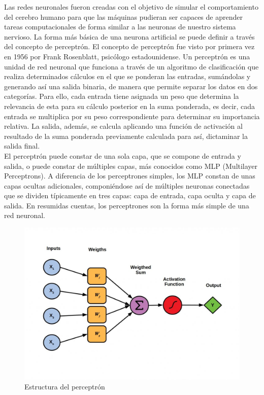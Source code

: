 Las redes neuronales fueron creadas con el objetivo de simular el comportamiento del cerebro humano para que las máquinas pudieran ser capaces de aprender tareas computacionales de forma similar a las neuronas de nuestro sistema nervioso. La forma más básica de una neurona artificial se puede definir a través del concepto de perceptrón. El concepto de perceptrón fue visto por primera vez en 1956 por Frank Rosenblatt, psicólogo estadounidense. Un perceptrón es una unidad de red neuronal que funciona a través de un algoritmo de clasificación que realiza determinados cálculos en el que se ponderan las entradas, sumándolas y generando así una salida binaria, de manera que permite separar los datos en dos categorías. Para ello, cada entrada tiene asignada un peso que determina la relevancia de esta para su cálculo posterior en la suma ponderada, es decir, cada entrada se multiplica por su peso correspondiente para determinar su importancia relativa. La salida, además, se calcula aplicando una función de activación al resultado de la suma ponderada previamente calculada para así, dictaminar la salida final.\\

El perceptrón puede constar de una sola capa, que se compone de entrada y salida, o puede constar de múltiples capas, más conocidos como MLP (Multilayer Perceptrons). A diferencia de los perceptrones simples, los MLP constan de unas capas ocultas adicionales, componiéndose así de múltiples neuronas conectadas que se dividen típicamente en tres capas: capa de entrada, capa oculta y capa de salida. En resumidas cuentas, los perceptrones son la forma más simple de una red neuronal.\\

\begin{figure}[h]
	\centering
	\includegraphics[width = 1 \textwidth]{Imagenes/Vectorial/Perceptrones.jpeg}
	\caption{Estructura del perceptrón}
	\label{fig:perceptron}
\end{figure}

